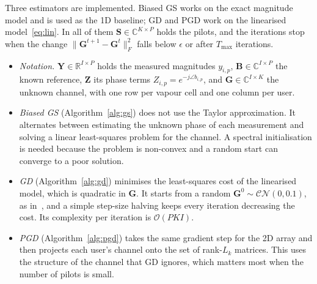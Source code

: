 \documentclass[11pt,a4paper]{article}
\begin{document}
Three estimators are implemented. Biased GS works on the exact magnitude model and is used as
the 1D baseline; GD and PGD work on the linearised model~\eqref{eq:lin}. In all of them
$\mathbf S\in\mathbb C^{K\times P}$ holds the pilots, and the iterations stop when the change
$\|\mathbf G^{t+1}-\mathbf G^{t}\|_F^2$ falls below $\epsilon$ or after $T_{\max}$ iterations.

\begin{itemize}[leftmargin=*,itemsep=2pt]
  \item \textit{Notation.} $\mathbf Y\in\mathbb R^{I\times P}$ holds the measured magnitudes
        $y_{i,p}$, $\mathbf B\in\mathbb C^{I\times P}$ the known reference, $\mathbf Z$ its phase
        terms $Z_{i,p}=e^{-j\angle b_{i,p}}$, and $\mathbf G\in\mathbb C^{I\times K}$ the unknown
        channel, with one row per vapour cell and one column per user.
  \item \textit{Biased GS} (Algorithm~\ref{alg:gs}) does not use the Taylor approximation. It
        alternates between estimating the unknown phase of each measurement and solving a
        linear least-squares problem for the channel. A spectral initialisation is needed
        because the problem is non-convex and a random start can converge to a poor solution.
  \item \textit{GD} (Algorithm~\ref{alg:gd}) minimises the least-squares cost of the linearised
        model, which is quadratic in $\mathbf G$. It starts from a random
        $\mathbf G^0\sim\mathcal{CN}(0,0.1)$, as in~\cite{xu2025channel}, and a simple step-size
        halving keeps every iteration decreasing the cost. Its complexity per iteration is
        $\mathcal O(PKI)$.
  \item \textit{PGD} (Algorithm~\ref{alg:pgd}) takes the same gradient step for the 2D array and
        then projects each user's channel onto the set of rank-$L_k$ matrices. This uses the
        structure of the channel that GD ignores, which matters most when the number of pilots
        is small.
\end{itemize}
\end{document}
